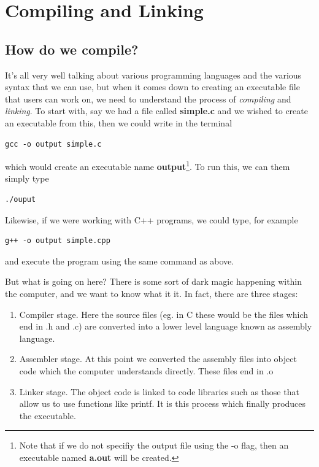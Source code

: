 \chapter{Compiling and Linking}

\section{How do we compile?}

It's all very well talking about various programming languages and the various syntax that we can use, but when it comes down to creating an executable file that users can work on, we need to understand the process of \emph{compiling} and \emph{linking}. To start with, say we had a file called {\bf simple.c} and we wished to create an executable from this, then we could write in the terminal
\begin{verbatim}
gcc -o output simple.c
\end{verbatim}
which would create an executable name {\bf output}\footnote{Note that if we do not specifiy the output file using the -o flag, then an executable named {\bf a.out} will be created.}. To run this, we can them simply type
\begin{verbatim}
./ouput
\end{verbatim}
Likewise, if we were working with C++ programs, we could type, for example
\begin{verbatim}
g++ -o output simple.cpp
\end{verbatim}
and execute the program using the same command as above. 

But what is going on here? There is some sort of dark magic happening within the computer, and we want to know what it it. In fact, there are three stages:
\begin{enumerate}
\item Compiler stage. Here the source files (eg. in C these would be the files which end in .h and .c) are converted into a lower level language known as assembly language. 
\item Assembler stage. At this point we converted the assembly files into object code which the computer understands directly. These files end in .o
\item Linker stage. The object code is linked to code libraries such as those that allow us to use functions like printf. It is this process which finally produces the executable.
\end{enumerate}

